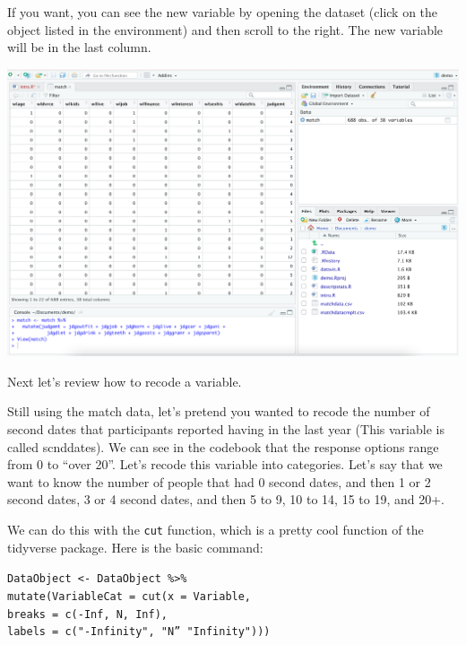 \documentclass[
]{book}
\begin{document}
If you want, you can see the new variable by opening the dataset (click on the object listed in the environment) and then scroll to the right. The new variable will be in the last column.

\includegraphics{img/DATA THINGS R112.png}

Next let's review how to recode a variable.

Still using the match data, let's pretend you wanted to recode the number of second dates that participants reported having in the last year (This variable is called scnddates). We can see in the codebook that the response options range from 0 to ``over 20''. Let's recode this variable into categories. Let's say that we want to know the number of people that had 0 second dates, and then 1 or 2 second dates, 3 or 4 second dates, and then 5 to 9, 10 to 14, 15 to 19, and 20+.

We can do this with the \texttt{cut} function, which is a pretty cool function of the tidyverse package. Here is the basic command:

\texttt{DataObject\ \textless{}-\ DataObject\ \%\textgreater{}\%}\\
\texttt{mutate(VariableCat\ =\ cut(x\ =\ Variable,}~\\
\texttt{breaks\ =\ c(-Inf,\ N,\ Inf),}~\\
\texttt{labels\ =\ c("-Infinity",\ "N”\ "Infinity")))}
\end{document}

